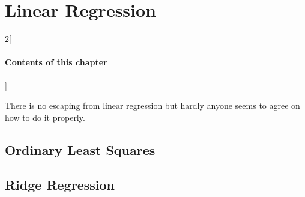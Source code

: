 \chapter{Linear Regression}

\begin{multicols}{2}[\subsubsection*{Contents of this chapter}]
\end{multicols}

There is no escaping from linear regression but hardly anyone seems to agree on how to do it properly.


\section{Ordinary Least Squares}

\section{Ridge Regression}




\chapauthor{}

